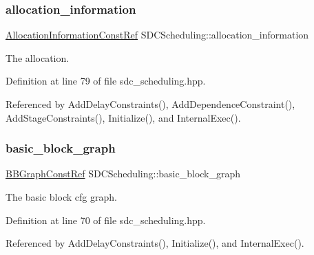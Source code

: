 \subsubsection{\texorpdfstring{allocation\+\_\+information}{allocation\_information}}
{\footnotesize\ttfamily \hyperlink{allocation__information_8hpp_a54287618a63bf87e31ddb17ba01e7ca7}{Allocation\+Information\+Const\+Ref} S\+D\+C\+Scheduling\+::allocation\+\_\+information\hspace{0.3cm}{\ttfamily [protected]}}



The allocation. 



Definition at line 79 of file sdc\+\_\+scheduling.\+hpp.



Referenced by Add\+Delay\+Constraints(), Add\+Dependence\+Constraint(), Add\+Stage\+Constraints(), Initialize(), and Internal\+Exec().

\mbox{\label{classSDCScheduling_a8b1faca802e0fdba5802b2a36e2129fc}} 
\subsubsection{\texorpdfstring{basic\+\_\+block\+\_\+graph}{basic\_block\_graph}}
{\footnotesize\ttfamily \hyperlink{basic__block_8hpp_ab66bdbde3a29e41d079d8a320af9c921}{B\+B\+Graph\+Const\+Ref} S\+D\+C\+Scheduling\+::basic\+\_\+block\+\_\+graph\hspace{0.3cm}{\ttfamily [protected]}}



The basic block cfg graph. 



Definition at line 70 of file sdc\+\_\+scheduling.\+hpp.



Referenced by Add\+Delay\+Constraints(), Initialize(), and Internal\+Exec().

\mbox{\label{classSDCScheduling_a1a6c5e7876d16458e880b67554d5fbe8}} 
